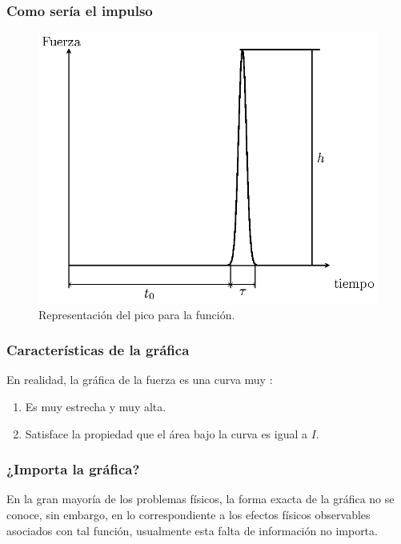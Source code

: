 \documentclass[12pt]{beamer}
\begin{document}
\begin{frame}
\frametitle{Como sería el impulso}
\begin{figure}[H]
    \centering
    \includegraphics[scale=1]{Imagenes/delta_Dirac_01.eps}
    \caption{Representación del pico para la función.}
    \label{fig:figura_delta_Dirac_01}
\end{figure}
\end{frame}
\begin{frame}
\frametitle{Características de la gráfica}
En realidad, la gráfica de la fuerza es una curva muy :
\begin{enumerate}[<+->]
\item Es muy estrecha y muy alta. %
\item Satisface la propiedad que el área bajo la curva es igual a $I$.
\end{enumerate}
\end{frame}
\begin{frame}
\frametitle{¿Importa la gráfica?}
En la gran mayoría de los problemas físicos, la forma exacta de la gráfica no se conoce, \pause sin embargo, en lo correspondiente a los efectos físicos observables asociados con tal función, usualmente esta falta de información no importa.
\end{frame}
\end{document}

